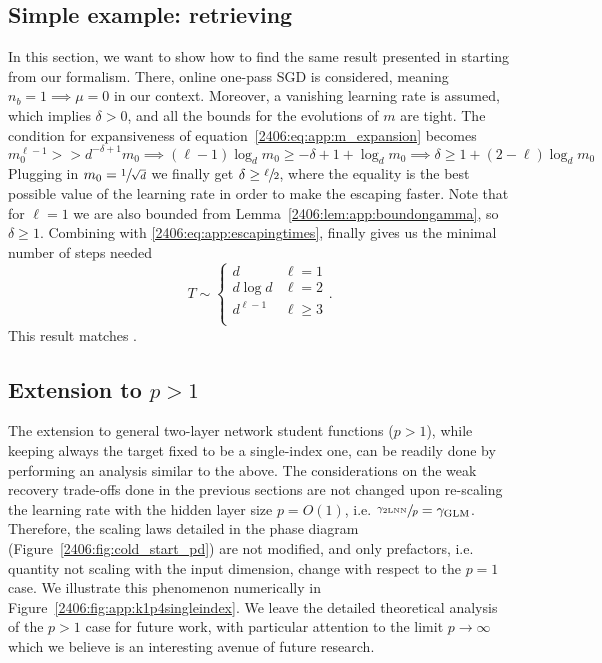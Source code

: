 \subsection{Simple example: retrieving \texorpdfstring{\cite{arous2021online}}{[arous2021online]}}
In this section, we want to show how to find the same result presented in \cite{arous2021online} starting from our formalism.
There, online one-pass SGD is considered, meaning \(n_b=1 \implies \mu = 0\) in our context. Moreover, a vanishing learning rate is assumed, which implies \(\delta>0\), and all the bounds for the evolutions of \(m\) are tight. The condition for expansiveness of equation~\eqref{2406:eq:app:m_expansion} becomes
\[
m_0^{\ell-1} >  > d^{-\delta+1}m_0 \implies (\ell-1)\log_d m_0 \ge -\delta + 1 + \log_d m_0 \implies \delta \ge 1 + (2-\ell)\log_d m_0
\]
Plugging in \(m_0 = \sfrac{1}{\sqrt{d}}\)  we finally get \(\delta \ge \sfrac{\ell}{2}\), where the equality is the best possible value of the learning rate in order to make the escaping faster. Note that for \(\ell=1\) we are also bounded from Lemma~\ref{2406:lem:app:boundongamma}, so \(\delta\ge1\). Combining with \eqref{2406:eq:app:escapingtimes}, finally gives us the minimal number of steps needed
\begin{equation}
    T \sim \begin{cases}
        d & \ell =1 \\
        d\log d & \ell=2 \\
        d^{\ell-1} & \ell\ge3 \\
 \end{cases}.
\end{equation}
This result matches \cite{arous2021online}.
\subsection{Extension to \texorpdfstring{$p>1$}{p>1}}
The extension to general two-layer network student functions ($p>1$), while keeping always the target fixed to be a single-index one, can be readily done by performing an analysis similar to the above. The considerations on the weak recovery trade-offs done in the previous sections are not changed upon re-scaling the learning rate with the hidden layer size $p=O(1)$, i.e. $\sfrac{\gamma_{\rm 2LNN}}{p} = \gamma_{\rm GLM}$. Therefore, the scaling laws detailed in the phase diagram (Figure~\ref{2406:fig:cold_start_pd}) are not modified, and only prefactors, i.e. quantity not scaling with the input dimension, change with respect to the $p=1$ case. We illustrate this phenomenon numerically in Figure~\ref{2406:fig:app:k1p4singleindex}. We leave the detailed theoretical analysis of the $p>1$ case for future work, with particular attention to the limit $p \to \infty$ which we believe is an interesting avenue of future research.


